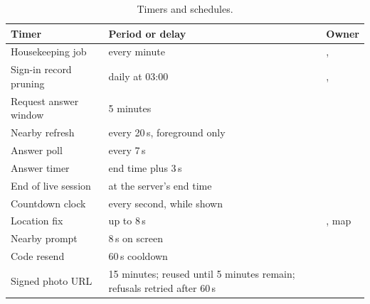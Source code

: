\begin{table}[ht]
  \centering
  \caption{Timers and schedules.}
  \label{tab:timers}
  \tablefont
  \begin{tabularx}{\textwidth}{@{}L{48mm}L{40mm}Y@{}}
    \toprule
    \textsf{\textbf{Timer}} & \textsf{\textbf{Period or delay}} & \textsf{\textbf{Owner}} \\
    \midrule
    Housekeeping job & every minute & ,  \\
    Sign-in record pruning & daily at 03:00 & ,  \\
    Request answer window & 5 minutes &  \\
    Nearby refresh & every 20\,s, foreground only &  \\
    Answer poll & every 7\,s &  \\
    Answer timer & end time plus 3\,s &  \\
    End of live session & at the server's end time &  \\
    Countdown clock & every second, while shown &  \\
    Location fix & up to 8\,s & , map \\
    Nearby prompt & 8\,s on screen &  \\
    Code resend & 60\,s cooldown &  \\
    Signed photo URL & 15 minutes; reused until 5 minutes remain; refusals retried after 60\,s &  \\
    \bottomrule
  \end{tabularx}
\end{table}
